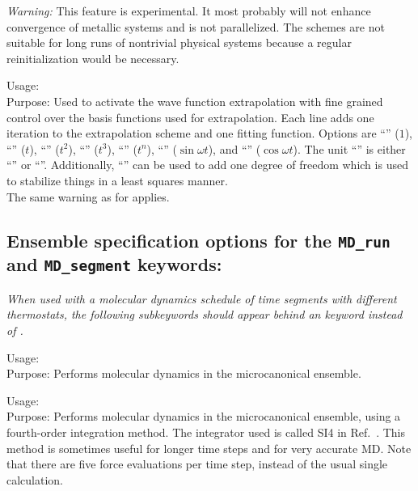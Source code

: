 \emph{Warning:} This feature is experimental.  It most probably will
not enhance convergence of metallic systems and is not parallelized.  The
 schemes are not suitable for long runs of nontrivial
physical systems because a regular reinitialization would be necessary.

{\noindent
  Usage:   \\[1.0em]
  Purpose: Used to activate the wave function extrapolation with fine grained
  control over the basis functions used for extrapolation.  Each
   line adds one iteration to the extrapolation scheme and
  one fitting function.  Options are ``'' ($1$),
  ``'' ($t$), ``'' ($t^2$),
  ``'' ($t^3$), ``'' ($t^n$),
  ``'' ($\sin\omega t$), and ``'' ($\cos\omega t$).  The unit ``'' is either
  ``'' or ``''.  Additionally, ``''
  can be used to add one degree of freedom which is used to stabilize things
  in a least squares manner.
  \\[1.0em]
}
The same warning as for  applies.


\newpage

\subsection*{Ensemble specification options for the \texttt{MD\_run} and
  \texttt{MD\_segment} keywords:} 

\emph{When used with a molecular dynamics schedule of time segments with
  different thermostats, the following subkeywords should appear behind an
   keyword instead of .}

{\noindent
  Usage:    \\[1.0ex]
  Purpose: Performs molecular dynamics in the microcanonical
    ensemble. \\[1.0ex]
}

{\noindent
  Usage:    \\[1.0ex]
  Purpose: Performs molecular dynamics in the microcanonical
    ensemble, using a fourth-order integration method. The integrator used is 
    called SI4 in Ref.~\cite{Ishida98}. This method is sometimes useful for 
    longer time steps and for very accurate MD. Note that there are five 
    force evaluations per time step, instead of the usual single calculation.\\[1.0ex]
}

